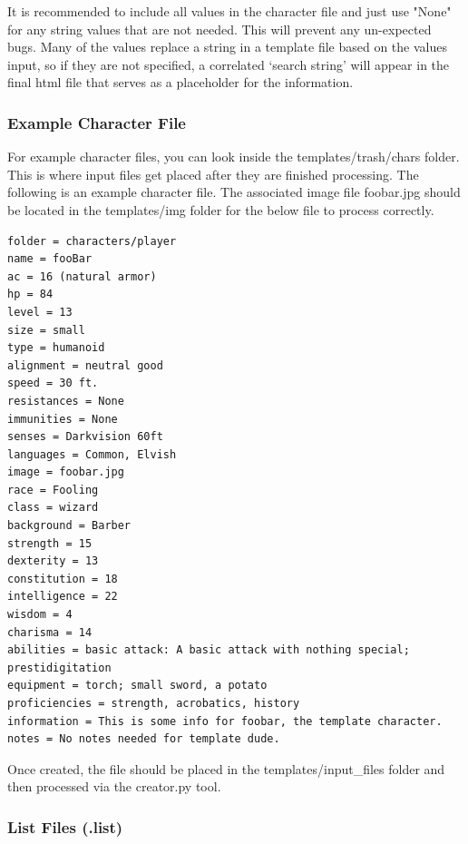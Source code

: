 It is recommended to include all values in the character file and just use "None" for any string values that are not needed. This will prevent any un-expected bugs. Many of the values replace a string in a template file based on the values input, so if they are not specified, a correlated `search string' will appear in the final html file that serves as a placeholder for the information.






\subsubsection{Example Character File}

For example character files, you can look inside the templates/trash/chars folder. This is where input files get placed after they are finished processing. The following is an example character file. The associated image file foobar.jpg should be located in the templates/img folder for the below file to process correctly.

\begin{lstlisting}
folder = characters/player
name = fooBar
ac = 16 (natural armor)
hp = 84
level = 13
size = small
type = humanoid
alignment = neutral good
speed = 30 ft.
resistances = None
immunities = None
senses = Darkvision 60ft
languages = Common, Elvish
image = foobar.jpg
race = Fooling
class = wizard
background = Barber
strength = 15
dexterity = 13
constitution = 18
intelligence = 22
wisdom = 4
charisma = 14
abilities = basic attack: A basic attack with nothing special; prestidigitation
equipment = torch; small sword, a potato
proficiencies = strength, acrobatics, history
information = This is some info for foobar, the template character.
notes = No notes needed for template dude.
\end{lstlisting}

Once created, the file should be placed in the templates/input\_files folder and then processed via the creator.py tool.





\subsubsection{List Files (.list)}















